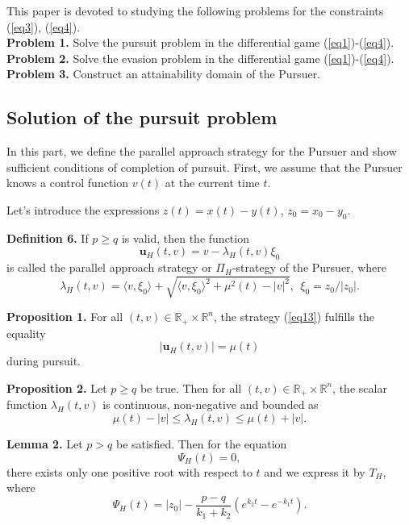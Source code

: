 \documentclass[10 pt]{book}
\begin{document}
This paper is devoted to studying the following problems for the constraints (\ref{eq3}),
(\ref{eq4}).\\
\textbf{Problem 1.} Solve the pursuit problem in the differential game (\ref{eq1})-(\ref{eq4}).\\
\textbf{Problem 2.} Solve the evasion problem in the differential game (\ref{eq1})-(\ref{eq4}).\\
\textbf{Problem 3.} Construct an attainability domain of the Pursuer.\\

\subsection*{Solution of the pursuit problem}


In this part, we define the parallel approach strategy for the Pursuer and
show sufficient conditions of completion of pursuit. First, we assume that
the Pursuer knows a control function $v(t)$ at the current time $t$.

Let's introduce the expressions $z(t)=x(t)-y(t)$, $z_{0}=x_{0}-y_{0}$.

\textbf{Definition 6.} If  $p \ge q$ is valid, then the function
\begin{equation}\label{eq13}
\textbf{u}_{H}(t,v)=v-\lambda_{H}(t,v)\xi_0
\end{equation}
is called the parallel approach strategy or $\Pi_{H}$-strategy of the Pursuer, where \\
$$\lambda_{H}(t,v)=\langle v,\xi_0\rangle+\sqrt{\langle
v,\xi_0\rangle^2+\mu^{2}(t)-|v|^{2}}, \ \ \xi_{0}=z_{0}/|z_0|.$$

\textbf{Proposition 1.} For all $(t,v)\in \mathbb{R}_{+}\times\mathbb{R}^n$, the strategy (\ref{eq13}) fulfills the equality
\begin{equation}\label{eq14}
|\textbf{u}_{H}(t, v)|=\mu(t)
\end{equation}
during pursuit.

\textbf{Proposition 2.} Let $p \ge q$ be true. Then for all $(t,v)\in \mathbb{R}_{+}\times\mathbb{R}^n$, the scalar function $\lambda_{H}(t,v)$ is continuous, non-negative and bounded as
\begin{equation}\label{eq15}
\mu(t)-|v| \leq \lambda_{H}(t,v)\leq \mu(t)+|v|.
\end{equation}

\textbf{Lemma 2.} Let $p > q$ be satisfied. Then for the equation
\begin{equation}\label{eq16}
\Psi_{H}(t)=0,
\end{equation}
there exists only one positive root with respect to $t$ and we express it by $T_{H}$, where $$\Psi_{H}(t)=|z_{0}| -\frac{p-q}{k_{1}+k_{2}} (e^{k_{2}t}-e^{-k_{1}t}).$$
\end{document}
